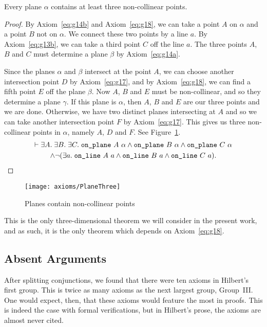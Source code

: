 \label{sec:PlaneThree}
\begin{proposition}
Every plane $\alpha$ contains at least three non-collinear points.
\end{proposition}
\begin{proof}
By Axiom~\ref{eq:g14b} and Axiom~\ref{eq:g18}, we can take a point $A$ on $\alpha$ and a point $B$ not on $\alpha$. We connect these two points by a line $a$. By Axiom~\ref{eq:g13b}, we can take a third point $C$ off the line $a$. The three points $A$, $B$ and $C$ must determine a plane $\beta$ by Axiom~\ref{eq:g14a}.

Since the planes $\alpha$ and $\beta$ intersect at the point $A$, we can choose another intersection point $D$ by Axiom~\ref{eq:g17}, and by Axiom~\ref{eq:g18}, we can find a fifth point $E$ off the plane $\beta$. Now $A$, $B$ and $E$ must be non-collinear, and so they determine a plane $\gamma$. If this plane is $\alpha$, then $A$, $B$ and $E$ are our three points and we are done. Otherwise, we have two distinct planes intersecting at $A$ and so we can take another intersection point $F$ by Axiom~\ref{eq:g17}. This gives us three non-collinear points in $\alpha$, namely $A$, $D$ and $F$. See Figure~\ref{fig:PlaneThree}.
\begin{multline}\label{eq:PlaneThree}
\vdash\exists A.\;\exists B.\;\exists C.\; \texttt{on\_plane}\ A\ \alpha \wedge \texttt{on\_plane}\ B\ \alpha \wedge \texttt{on\_plane}\ C\ \alpha\\
\wedge\neg(\exists a.\; \texttt{on\_line}\ A\ a\wedge \texttt{on\_line}\ B\ a\wedge \texttt{on\_line}\ C\ a).
\end{multline}
\end{proof}
\begin{figure}
\centering\texttt{[image: axioms/PlaneThree]}
\caption{Planes contain non-collinear points}
\label{fig:PlaneThree}
\end{figure}

This is the only three-dimensional theorem we will consider in the present work, and as such, it is the only theorem which depends on Axiom~\ref{eq:g18}.

\subsection{Absent Arguments}
After splitting conjunctions, we found that there were ten axioms in Hilbert's first group. This is twice as many axioms as the next largest group, Group~III. One would expect, then, that these axioms would feature the most in proofs. This is indeed the case with formal verifications, but in Hilbert's prose, the axioms are almost never cited.


